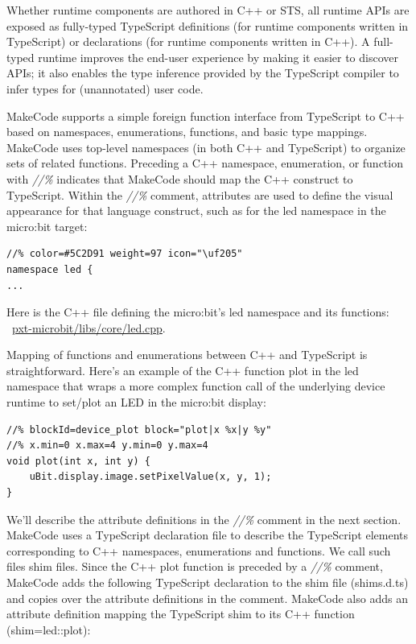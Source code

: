 Whether runtime components are authored in C++ or STS, all runtime APIs are exposed as fully-typed
TypeScript definitions (for runtime components written in TypeScript) or declarations (for runtime
components written in C++). A full-typed runtime improves the end-user experience by making it easier
to discover APIs; it also enables the type inference provided by the TypeScript compiler to infer types
for (unannotated) user code.

MakeCode supports a simple foreign function interface from TypeScript to C++ based on namespaces,
enumerations, functions, and basic type mappings. MakeCode uses top-level namespaces (in both C++ and
TypeScript) to organize sets of related functions.  Preceding a C++ namespace, enumeration, or function
with \emph{//\%} indicates that MakeCode should map the C++ construct to TypeScript.
Within the \emph{//\%} comment, attributes are used to define the visual appearance for that
language construct, such as for the led namespace in the micro:bit target:

\begin{lstlisting}
//% color=#5C2D91 weight=97 icon="\uf205"
namespace led { 
...
\end{lstlisting}

Here is the C++ file defining the micro:bit's led namespace and its functions:
~\href{https://github.com/Microsoft/pxt-microbit/blob/master/libs/core/led.cpp}{pxt-microbit/libs/core/led.cpp}.

Mapping of functions and enumerations between C++ and TypeScript is straightforward. 
Here's an example of the C++ function plot in the led namespace that wraps a more
complex function call of the underlying device runtime to set/plot an LED in the micro:bit display:

\begin{lstlisting}
//% blockId=device_plot block="plot|x %x|y %y"
//% x.min=0 x.max=4 y.min=0 y.max=4
void plot(int x, int y) {
    uBit.display.image.setPixelValue(x, y, 1);
}
\end{lstlisting}

We'll describe the attribute definitions in the \emph{//\%} comment in the next section. 
MakeCode uses a  TypeScript declaration file to describe the TypeScript elements corresponding
to C++ namespaces, enumerations and functions.  We call such files shim files.
Since the C++ plot function is preceded by a \emph{//\%} comment, 
MakeCode adds the following TypeScript declaration to the shim file (shims.d.ts) and copies
over the attribute definitions in the comment. MakeCode also adds an attribute definition mapping
the TypeScript shim to its C++ function (shim=led::plot):

